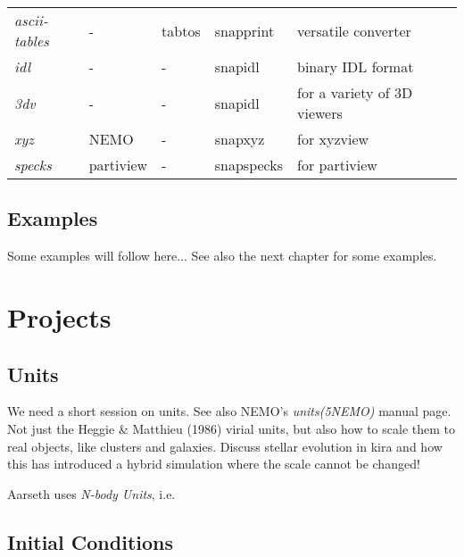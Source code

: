 \begin{center}
\begin{table}[h!]
\begin{tabular}{||l|l|l|l|l|l||}
{\it ascii-tables}   &   -   &  tabtos    &    snapprint     &   versatile converter\\

{\it idl}         &    -     &     -      &    snapidl        &   binary IDL format  \\
{\it 3dv}         &    -     &     -      &    snapidl        &   for a variety of 3D viewers \\
{\it xyz}         &   NEMO    &     -      &    snapxyz        &  for xyzview \\
{\it specks}      &  partiview &     -      &    snapspecks      &  for partiview \\







\hline 




\end{tabular}
\end{table}
\end{center}

\section{Examples}

Some examples will follow here... See also the next chapter for some examples.



\chapter                {Projects}

\section{Units}

We need a short session on units. See also NEMO's {\it units(5NEMO)} manual page.
Not just the Heggie \& Matthieu (1986) virial units, but also how to scale them to
real objects, like clusters and galaxies. Discuss stellar evolution in kira
and how this has introduced a hybrid simulation where the scale cannot be
changed!

Aarseth uses {\it N-body Units}, i.e.

\section{Initial Conditions}

